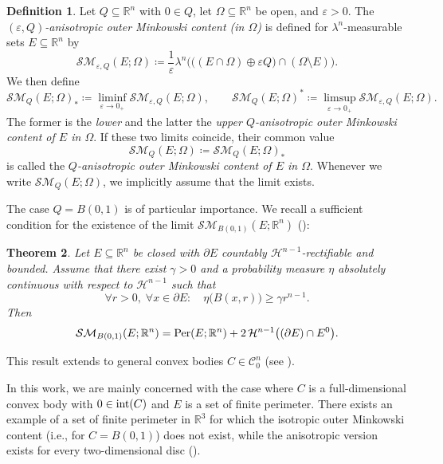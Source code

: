 \documentclass[pdflatex,sn-mathphys-num]{sn-jnl}
\theoremstyle{plain}
\newtheorem{theorem}{Theorem}[section]
\theoremstyle{definition}
\newtheorem{definition}[theorem]{Definition}
\begin{document}
\begin{definition}
Let $Q \subseteq \mathbb{R}^n$ with $0 \in Q$, let $\Omega \subseteq \mathbb{R}^n$ be open, and $\varepsilon > 0$.  
The \textit{$(\varepsilon, Q)$-anisotropic outer Minkowski content (in $\Omega$)} is defined for $\lambda^n$-measurable sets $E \subseteq \mathbb{R}^n$ by
\[
\mathcal{SM}_{\varepsilon, Q}(E; \Omega)
    \coloneq \frac{1}{\varepsilon}
    \lambda^n\!\Big( \big( (E \cap \Omega) \oplus \varepsilon Q \big) \cap (\Omega \setminus E) \Big).
\]
We then define
\[
\mathcal{SM}_Q(E; \Omega)_* \coloneq
    \liminf_{\varepsilon \to 0_+} \mathcal{SM}_{\varepsilon, Q}(E; \Omega),
    \qquad
\mathcal{SM}_Q(E; \Omega)^* \coloneq
    \limsup_{\varepsilon \to 0_+} \mathcal{SM}_{\varepsilon, Q}(E; \Omega).
\]
The former is the \textit{lower} and the latter the \textit{upper $Q$-anisotropic outer Minkowski content of $E$ in $\Omega$}.  
If these two limits coincide, their common value
\[
\mathcal{SM}_Q(E; \Omega) \coloneq \mathcal{SM}_Q(E; \Omega)_*
\]
is called the \textit{$Q$-anisotropic outer Minkowski content of $E$ in $\Omega$}.  
Whenever we write $\mathcal{SM}_Q(E; \Omega)$, we implicitly assume that the limit exists.
\end{definition}

The case $Q = B(0,1)$ is of particular importance.  
We recall a sufficient condition for the existence of the limit $\mathcal{SM}_{B(0,1)}(E; \mathbb{R}^n)$ (\cite[Theorem~3.1]{vrv}):

\begin{theorem}\label{closed}
Let $E \subseteq \mathbb{R}^n$ be closed with $\partial E$ countably $\mathcal{H}^{n-1}$-rectifiable and bounded.  
Assume that there exist $\gamma > 0$ and a probability measure $\eta$ absolutely continuous with respect to $\mathcal{H}^{n-1}$ such that
\[
\forall r > 0, \; \forall x \in \partial E:\quad
\eta\big(B(x, r)\big) \geq \gamma r^{n-1}.
\]
Then
\[
\mathcal{SM}_{B(0,1)}(E; \mathbb{R}^n)
    = \textup{Per}(E; \mathbb{R}^n)
      + 2\,\mathcal{H}^{n-1}\big((\partial E) \cap E^{0}\big).
\]
\end{theorem}

This result extends to general convex bodies $C \in \mathcal{C}^n_0$ (see \cite[Theorem~4.3]{Villa2}).

In this work, we are mainly concerned with the case where $C$ is a full-dimensional convex body with $0 \in \textup{int}(C)$ and $E$ is a set of finite perimeter.  
There exists an example of a set of finite perimeter in $\mathbb{R}^3$ for which the isotropic outer Minkowski content (i.e., for $C = B(0,1)$) does not exist, while the anisotropic version exists for every two-dimensional disc (\cite[Ex.~3]{Rataj}).
\end{document}
